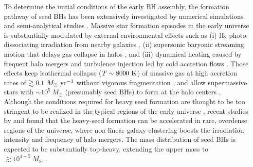 \documentclass[twocolumn, twocolappendix]{aastex63}
\newcommand{\Msun}{M_\odot}
\newcommand{\Msunyr}{M_\odot~{\rm yr}^{-1}}
\begin{document}
\begin{CJK*}{UTF8}{gbsn}
To determine the initial conditions of the early BH assembly,
the formation pathway of seed BHs has been extensively investigated by numerical simulations and semi-analytical studies
\citep{2006MNRAS.370..289B,2009ApJ...696.1798T,2012MNRAS.422.2051N,2014ApJ...781...60H,
2015MNRAS.448..568H,2018MNRAS.474.3825V,2021MNRAS.506..613S,2022arXiv220614459T,2022arXiv220505717B}.
Massive star formation episodes in the early universe is substantially modulated by external environmental effects such as
(i) H$_2$ photo-dissociating irradiation from nearby galaxies
\citep{2001ApJ...546..635O,2002ApJ...569..558O,2003Natur.425..812B,2010MNRAS.402.1249S,2014MNRAS.445..544S,2014MNRAS.445..107V,2016ApJ...832..134C},
(ii) supersonic baryonic streaming motion that delays gas collapse in halos
\citep{2012MNRAS.424.1335F, 2014MNRAS.439.1092T, 2018ApJ...855...17H,2017MNRAS.471.4878S,2018MNRAS.479.4017I},
and (iii) dynamical heating caused by frequent halo mergers and turbulence injection led by cold accretion flows
\citep{2003ApJ...592..645Y,2010Natur.466.1082M,2015ApJ...810...51M,2019Natur.566...85W,2022Natur.607...48L}.
Those effects keep isothermal collapse ($T\sim 8000~{\rm K}$) of massive gas at high accretion rates of $\gtrsim 0.1~\Msunyr$
without vigorous fragmentation \citep{2014MNRAS.445L.109I,2015MNRAS.446.2380B,2016PASA...33...51L},
and allow supermassive stars with $\sim 10^5~\Msun$ (presumably seed BHs) to form at the halo centers 
\citep{2013ApJ...778..178H,2013A&A...558A..59S,2019PASA...36...27W,2022arXiv220614459T}.
Although the conditions required for heavy seed formation are thought to be too stringent to be realized in the typical regions of the early universe
\citep{2008MNRAS.391.1961D,2009ApJ...695.1430A,2015MNRAS.450.4350I},
recent studies by \citet{2021MNRAS.503.5046L} and \citet{2021ApJ...917...60L} found that the heavy-seed formation
can be accelerated in rare, overdense regions of the universe, where non-linear galaxy clustering boosts the irradiation intensity
and frequency of halo mergers.
The mass distribution of seed BHs is expected to be substantially top-heavy, extending the upper mass to $\gtrsim 10^{4-5}~\Msun$
\citep{2021ApJ...917...60L, 2022arXiv220614459T}.



\end{CJK*}
\end{document}
